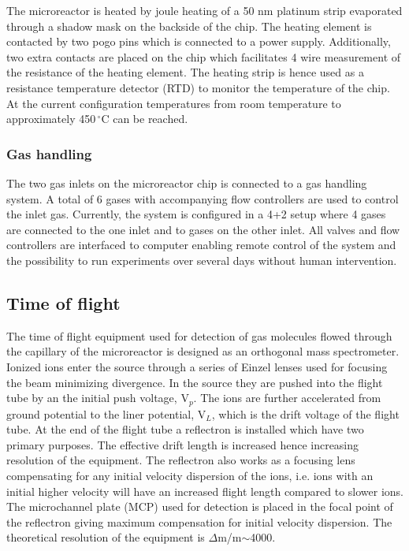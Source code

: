 \documentclass[aip,rsi]{revtex4-1}
\begin{document}
The microreactor is heated by joule heating of a 50 nm platinum strip evaporated through a shadow mask on the backside of the chip. The heating element is contacted by two pogo pins which is connected to a power supply. Additionally, two extra contacts are placed on the chip which facilitates 4 wire measurement of the resistance of the heating element. The heating strip is hence used as a resistance temperature detector (RTD) to monitor the temperature of the chip. At the current configuration temperatures from room temperature to approximately 450\,$^{\circ}$C can be reached.


\subsubsection{Gas handling}
The two gas inlets on the microreactor chip is connected to a gas handling system. A total of 6 gases with accompanying flow controllers are used to control the inlet gas. Currently, the system is configured in a 4+2 setup where 4 gases are connected to the one inlet and to gases on the other inlet. All valves and flow controllers are interfaced to computer enabling remote control of the system and the possibility to run experiments over several days without human intervention.

\subsection{Time of flight}
The time of flight equipment used for detection of gas molecules flowed through the capillary of the microreactor is designed as an orthogonal mass spectrometer. Ionized ions enter the source through a series of Einzel lenses used for focusing the beam minimizing divergence. In the source they are pushed into the flight tube by an the initial push voltage, V$_p$. The ions are further accelerated from ground potential to the liner potential, V$_L$, which is the drift voltage of the flight tube. At the end of the flight tube a reflectron is installed which have two primary purposes. The effective drift length is increased hence increasing resolution of the equipment. The reflectron also works as a focusing lens compensating for any initial velocity dispersion of the ions, i.e. ions with an initial higher velocity will have an increased flight length compared to slower ions. The microchannel plate (MCP) used for detection is placed in the focal point of the reflectron giving maximum compensation for initial velocity dispersion. The theoretical resolution of the equipment is $\Delta$m/m$\sim$4000.
\end{document}
